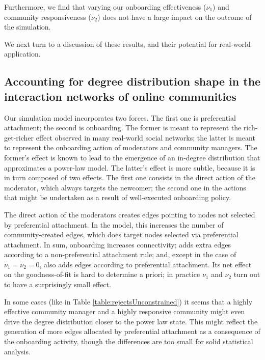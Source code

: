\documentclass{bmcart}
\begin{document}
Furthermore, we find that varying our onboarding effectiveness ($\nu_1$) and community responsiveness ($\nu_2$) does not have a large impact on the outcome of the simulation.

We next turn to a discussion of these results, and their potential for real-world application. 

\subsection{Accounting for degree distribution shape in the interaction networks of online communities}
\label{ss:accounting}

Our simulation model incorporates two forces. The first one is preferential attachment; the second is onboarding. The former is meant to represent the rich-get-richer effect observed in many real-world social networks; the latter is meant to represent the onboarding action of moderators and community managers. The former's effect is known to lead to the emergence of an in-degree distribution that approximates a power-law model. The latter's effect is more subtle, because it is in turn composed of two effects. The first one consists in the direct action of the moderator, which  always targets the newcomer; the second one in the actions that might be undertaken as a result of well-executed onboarding policy. 

The direct action of the moderators creates edges pointing to nodes not selected by preferential attachment. In the model, this increases the number of community-created edges, which does target nodes selected via preferential attachment. In sum, onboarding increases connectivity; adds extra edges according to a non-preferential attachment rule; and, except in the case of $\nu_ 1 = \nu_2 = 0$, also adds edges  according to preferential attachment. Its net effect on the goodness-of-fit is hard to determine a priori; in practice $\nu_1$ and $\nu_2$ turn out to have a surprisingly small effect. 

In some cases (like in Table \ref{table:rejectsUnconstrained}) it seems that a highly effective community manager and a highly responsive community might even drive the degree distribution closer to the power law state. This might reflect the generation of more edges allocated by preferential attachment as a consequence of the onboarding activity, though the differences are too small for solid statistical analysis. 
\end{document}
